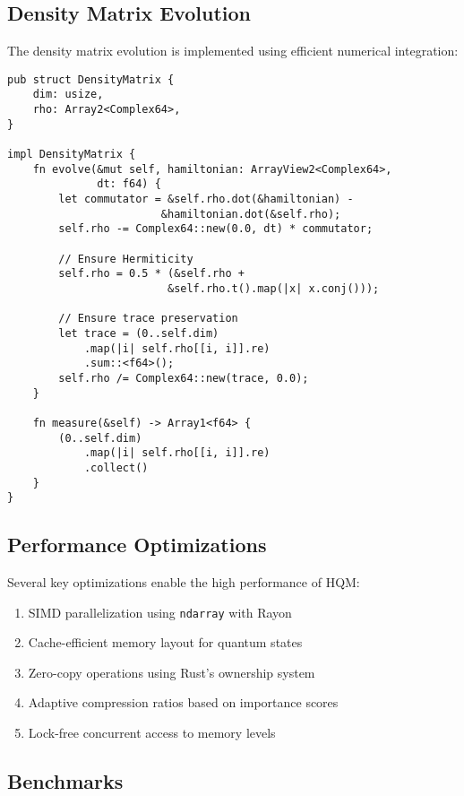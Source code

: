 \documentclass[10pt]{article}
\begin{document}
\subsection{Density Matrix Evolution}

The density matrix evolution is implemented using efficient numerical integration:

\begin{verbatim}
pub struct DensityMatrix {
    dim: usize,
    rho: Array2<Complex64>,
}

impl DensityMatrix {
    fn evolve(&mut self, hamiltonian: ArrayView2<Complex64>, 
              dt: f64) {
        let commutator = &self.rho.dot(&hamiltonian) - 
                        &hamiltonian.dot(&self.rho);
        self.rho -= Complex64::new(0.0, dt) * commutator;
        
        // Ensure Hermiticity
        self.rho = 0.5 * (&self.rho + 
                         &self.rho.t().map(|x| x.conj()));
        
        // Ensure trace preservation
        let trace = (0..self.dim)
            .map(|i| self.rho[[i, i]].re)
            .sum::<f64>();
        self.rho /= Complex64::new(trace, 0.0);
    }

    fn measure(&self) -> Array1<f64> {
        (0..self.dim)
            .map(|i| self.rho[[i, i]].re)
            .collect()
    }
}
\end{verbatim}

\subsection{Performance Optimizations}

Several key optimizations enable the high performance of HQM:

\begin{enumerate}
    \item SIMD parallelization using \texttt{ndarray} with Rayon
    \item Cache-efficient memory layout for quantum states
    \item Zero-copy operations using Rust's ownership system
    \item Adaptive compression ratios based on importance scores
    \item Lock-free concurrent access to memory levels
\end{enumerate}

\subsection{Benchmarks}
\end{document}

